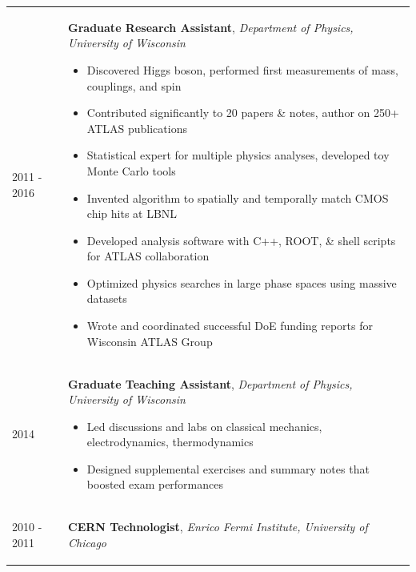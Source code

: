 \documentclass{letter}
\begin{document}
\begin{tabular}{p{}p{}}
	2011 - 2016
	&
	\textbf{Graduate Research Assistant}, \textit{Department of Physics, University of Wisconsin} \newline
	\vspace{-15pt}      %
	\begin{itemize}
		\itemsep0em
		\renewcommand{\labelitemi}{\tiny$\blacksquare$}
    		\item Discovered Higgs boson, performed first measurements of mass, couplings, and spin 
		\item Contributed significantly to 20 papers \& notes, author on 250+ ATLAS publications
    		\item Statistical expert for multiple physics analyses, developed toy Monte Carlo tools
		\item Invented algorithm to spatially and temporally match CMOS chip hits at LBNL 
    		\item Developed analysis software with C++, ROOT, \& shell scripts for ATLAS collaboration
		\item Optimized physics searches in large phase spaces using massive datasets
		\item Wrote and coordinated successful DoE funding reports for Wisconsin ATLAS Group
	\end{itemize}
\\
	2014 
	& 
	\textbf{Graduate Teaching Assistant}, \textit{Department of Physics, University of Wisconsin} \newline
	\vspace{-15pt}      %
	\begin{itemize}
		\itemsep0em
		\renewcommand{\labelitemi}{\tiny$\blacksquare$} 
		\item Led discussions and labs on classical mechanics, electrodynamics, thermodynamics
    		\item Designed supplemental exercises and summary notes that boosted exam performances
	\end{itemize}
\\
	2010 - 2011
	&
	\textbf{CERN Technologist}, \textit{Enrico Fermi Institute, University of Chicago} \newline
	\vspace{-15pt}      %
	\begin{itemize}

\end{itemize}
\end{tabular}
\end{document}
